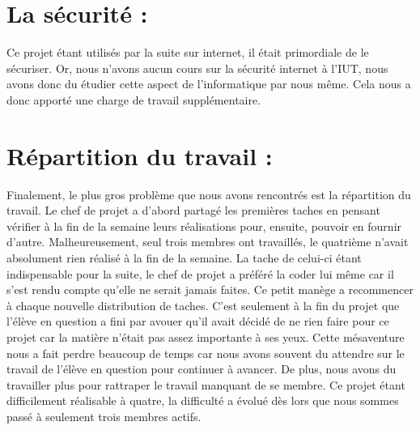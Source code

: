 \documentclass[11pt,a4paper,titlepage]{report}
\begin{document}
\section{La sécurité : }
Ce projet étant utilisés par la suite sur internet, il était primordiale de le sécuriser. Or, nous n'avons aucun cours sur la sécurité internet à l'IUT, nous avons donc du étudier cette aspect de l'informatique par nous même. Cela nous a donc apporté une charge de travail supplémentaire.

\section{Répartition du travail : }
Finalement, le plus gros problème que nous avons rencontrés est la répartition du travail. 
Le chef de projet a d'abord partagé les premières taches en pensant vérifier à la fin de la semaine leurs réalisations pour, ensuite, pouvoir en fournir d'autre. Malheureusement, seul trois membres ont travaillés, le quatrième n'avait absolument rien réalisé à la fin de la semaine. 
La tache de celui-ci étant indispensable pour la suite, le chef de projet a préféré la coder lui même car il s'est rendu compte qu'elle ne serait jamais faites.
Ce petit manège a recommencer à chaque nouvelle distribution de taches. C'est seulement à la fin du projet que l'élève en question a fini par avouer qu'il avait décidé de ne rien faire pour ce projet car la matière n'était pas assez importante à ses yeux. Cette mésaventure nous a fait perdre beaucoup de temps car nous avons souvent du attendre sur le travail de l'élève en question pour continuer à avancer. De plus, nous avons du travailler plus pour rattraper le travail manquant de se membre.
Ce projet étant difficilement réalisable à quatre, la difficulté a évolué dès lors que nous sommes passé à seulement trois membres actifs. 
\end{document}
